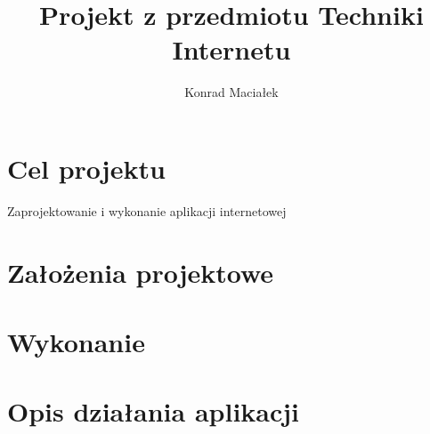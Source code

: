 \documentclass[a4paper,10pt]{article}
\title{Projekt z przedmiotu Techniki Internetu}
\author{Konrad Maciałek}
\begin{document}
\maketitle
\newpage

\section{Cel projektu}
Zaprojektowanie i wykonanie aplikacji internetowej 
\section{Założenia projektowe}
\section{Wykonanie}
\section{Opis działania aplikacji}
\end{document}
